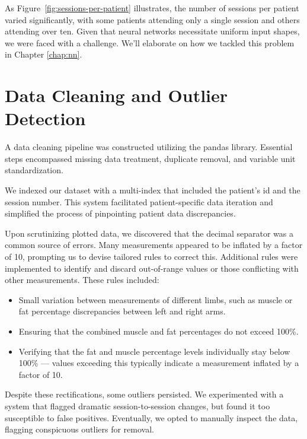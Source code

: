 As Figure~\ref{fig:sessions-per-patient} illustrates, the number of sessions
per patient varied significantly, with some patients attending only a single
session and others attending over ten. Given that neural networks necessitate
uniform input shapes, we were faced with a challenge. We'll elaborate on how we
tackled this problem in Chapter \ref{chap:nn}.

\section{Data Cleaning and Outlier Detection}

A data cleaning pipeline was constructed utilizing the \gls{pandas} library.
Essential steps encompassed missing data treatment, duplicate removal, and
variable unit standardization.

We indexed our dataset with a multi-index that included the patient's id and
the session number. This system facilitated patient-specific data iteration and
simplified the process of pinpointing patient data discrepancies.

Upon scrutinizing plotted data, we discovered that the decimal separator was a
common source of errors. Many measurements appeared to be inflated by a factor
of 10, prompting us to devise tailored rules to correct this. Additional rules
were implemented to identify and discard out-of-range values or those
conflicting with other measurements. These rules included:

\begin{itemize}
	\item Small variation between measurements of different limbs, such as muscle or fat
	      percentage discrepancies between left and right arms.
	\item Ensuring that the combined muscle and fat percentages do not exceed 100\%.
	\item Verifying that the fat and muscle percentage levels individually stay below
	      100\% --- values exceeding this typically indicate a measurement inflated by a
	      factor of 10.
\end{itemize}

Despite these rectifications, some outliers persisted. We experimented with a
system that flagged dramatic session-to-session changes, but found it too
susceptible to false positives. Eventually, we opted to manually inspect the
data, flagging conspicuous outliers for removal.

